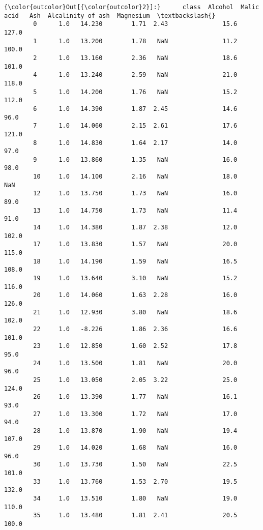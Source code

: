 \documentclass[11pt]{article}
\begin{document}
\begin{Verbatim}[commandchars=\\\{\}]
{\color{outcolor}Out[{\color{outcolor}2}]:}      class  Alcohol  Malic acid   Ash  Alcalinity of ash  Magnesium  \textbackslash{}
        0      1.0   14.230        1.71  2.43               15.6      127.0   
        1      1.0   13.200        1.78   NaN               11.2      100.0   
        2      1.0   13.160        2.36   NaN               18.6      101.0   
        4      1.0   13.240        2.59   NaN               21.0      118.0   
        5      1.0   14.200        1.76   NaN               15.2      112.0   
        6      1.0   14.390        1.87  2.45               14.6       96.0   
        7      1.0   14.060        2.15  2.61               17.6      121.0   
        8      1.0   14.830        1.64  2.17               14.0       97.0   
        9      1.0   13.860        1.35   NaN               16.0       98.0   
        10     1.0   14.100        2.16   NaN               18.0        NaN   
        12     1.0   13.750        1.73   NaN               16.0       89.0   
        13     1.0   14.750        1.73   NaN               11.4       91.0   
        14     1.0   14.380        1.87  2.38               12.0      102.0   
        17     1.0   13.830        1.57   NaN               20.0      115.0   
        18     1.0   14.190        1.59   NaN               16.5      108.0   
        19     1.0   13.640        3.10   NaN               15.2      116.0   
        20     1.0   14.060        1.63  2.28               16.0      126.0   
        21     1.0   12.930        3.80   NaN               18.6      102.0   
        22     1.0   -8.226        1.86  2.36               16.6      101.0   
        23     1.0   12.850        1.60  2.52               17.8       95.0   
        24     1.0   13.500        1.81   NaN               20.0       96.0   
        25     1.0   13.050        2.05  3.22               25.0      124.0   
        26     1.0   13.390        1.77   NaN               16.1       93.0   
        27     1.0   13.300        1.72   NaN               17.0       94.0   
        28     1.0   13.870        1.90   NaN               19.4      107.0   
        29     1.0   14.020        1.68   NaN               16.0       96.0   
        30     1.0   13.730        1.50   NaN               22.5      101.0   
        33     1.0   13.760        1.53  2.70               19.5      132.0   
        34     1.0   13.510        1.80   NaN               19.0      110.0   
        35     1.0   13.480        1.81  2.41               20.5      100.0   

\end{Verbatim}
\end{document}
